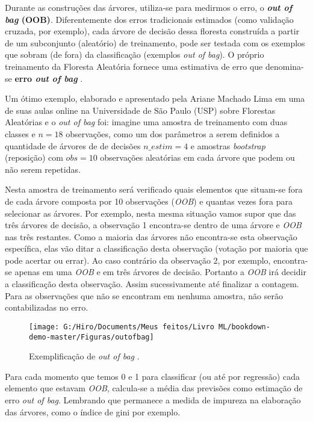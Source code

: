 \documentclass[
  openany]{book}
\begin{document}
Durante as construções das árvores, utiliza-se para medirmos o erro, o \textbf{\emph{out of bag} (OOB)}. Diferentemente dos erros tradicionais estimados (como validação cruzada, por exemplo), cada árvore de decisão dessa floresta construída a partir de um subconjunto (aleatório) de treinamento, pode ser testada com os exemplos que sobram (de fora) da classificação (exemplos \emph{out of bag}). O próprio treinamento da Floresta Aleatória fornece uma estimativa de erro que denomina-se \textbf{erro \emph{out of bag} }.

Um ótimo exemplo, elaborado e apresentado pela Ariane Machado Lima em uma de suas aulas online na Universidade de São Paulo (USP) sobre Florestas Aleatórias e o \emph{out of bag} foi: imagine uma amostra de treinamento com duas classes e \(n=18\) observações, como um dos parâmetros a serem definidos a quantidade de árvores de de decisões \(n\_estim=4\) e amostras \emph{bootstrap} (reposição) com \(obs=10\) observações aleatórias em cada árvore que podem ou não serem repetidas.

Nesta amostra de treinamento será verificado quais elementos que situam-se fora de cada árvore composta por 10 observações (\emph{OOB}) e quantas vezes fora para selecionar as árvores. Por exemplo, nesta mesma situação vamos supor que das três árvores de decisão, a observação 1 encontra-se dentro de uma árvore e \emph{OOB} nas três restantes. Como a maioria das árvores não encontra-se esta observação específica, elas vão ditar a classificação desta observação (votação por maioria que pode acertar ou errar). Ao caso contrário da observação 2, por exemplo, encontra-se apenas em uma \emph{OOB} e em três árvores de decisão. Portanto a \emph{OOB} irá decidir a classificação desta observação. Assim sucessivamente até finalizar a contagem. Para as observações que não se encontram em nenhuma amostra, não serão contabilizadas no erro.

\begin{figure}

{\centering \texttt{[image: G:/Hiro/Documents/Meus feitos/Livro ML/bookdown-demo-master/Figuras/outofbag]} 

}

\caption{Exemplificação de \emph{out of bag} \citep{machadousprf}.}\label{fig:outofbag}
\end{figure}



Para cada momento que temos 0 e 1 para classificar (ou até por regressão) cada elemento que estavam \emph{OOB}, calcula-se a média das previsões como estimação de erro \emph{out of bag}. Lembrando que permanece a medida de impureza na elaboração das árvores, como o índice de gini por exemplo.
\end{document}
